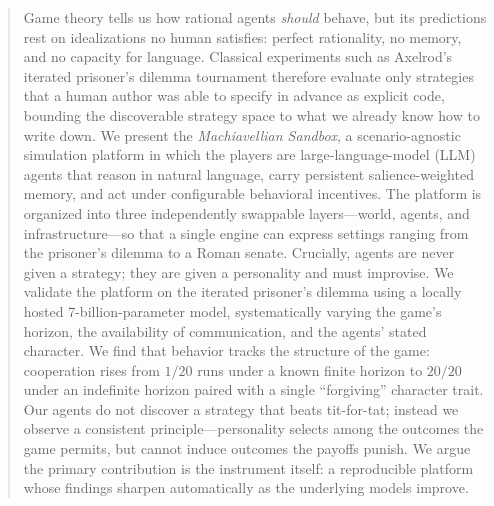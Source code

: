 \begin{abstract}
Game theory tells us how rational agents \emph{should} behave, but its predictions rest on idealizations no human satisfies: perfect rationality, no memory, and no capacity for language. Classical experiments such as Axelrod's iterated prisoner's dilemma tournament therefore evaluate only strategies that a human author was able to specify in advance as explicit code, bounding the discoverable strategy space to what we already know how to write down. We present the \emph{Machiavellian Sandbox}, a scenario-agnostic simulation platform in which the players are large-language-model (LLM) agents that reason in natural language, carry persistent salience-weighted memory, and act under configurable behavioral incentives. The platform is organized into three independently swappable layers---world, agents, and infrastructure---so that a single engine can express settings ranging from the prisoner's dilemma to a Roman senate. Crucially, agents are never given a strategy; they are given a personality and must improvise. We validate the platform on the iterated prisoner's dilemma using a locally hosted 7-billion-parameter model, systematically varying the game's horizon, the availability of communication, and the agents' stated character. We find that behavior tracks the structure of the game: cooperation rises from $1/20$ runs under a known finite horizon to $20/20$ under an indefinite horizon paired with a single ``forgiving'' character trait. Our agents do not discover a strategy that beats tit-for-tat; instead we observe a consistent principle---personality selects among the outcomes the game permits, but cannot induce outcomes the payoffs punish. We argue the primary contribution is the instrument itself: a reproducible platform whose findings sharpen automatically as the underlying models improve.
\end{abstract}


\maketitle

\begingroup
\renewcommand\thefootnote{}\addtocounter{footnote}{-1}
\endgroup

